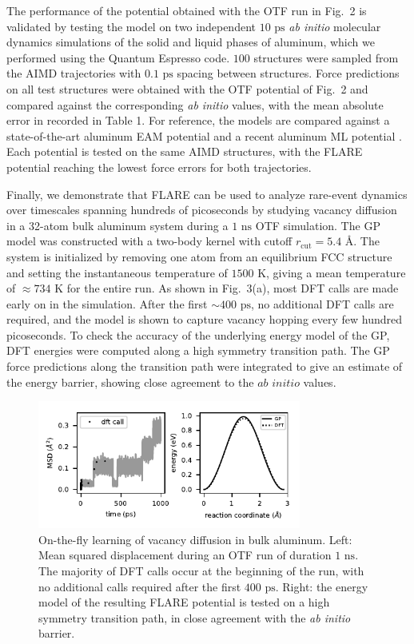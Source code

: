 \documentclass[%
superscriptaddress,
preprint,
linenumbers,
amsmath,amssymb,
aps,
prl,
]{revtex4-1}
\begin{document}
The performance of the potential obtained with the OTF run in Fig.\ 2 is validated by testing the model on two independent $10 \text{ ps}$ \textit{ab initio} molecular dynamics simulations of the solid and liquid phases of aluminum, which we performed using the Quantum Espresso code. $100$ structures were sampled from the AIMD trajectories with $0.1 \text{ ps}$ spacing between structures. Force predictions on all test structures were obtained with the OTF potential of Fig.\ 2 and compared against the corresponding \textit{ab initio} values, with the mean absolute error in  recorded in Table 1. For reference, the models are compared against a state-of-the-art aluminum EAM potential \cite{sheng2011highly} and a recent aluminum ML potential \cite{botu2016machine}. Each potential is tested on the same AIMD structures, with the FLARE potential reaching the lowest force errors for both trajectories.

Finally, we demonstrate that FLARE can be used to analyze rare-event dynamics over timescales spanning hundreds of picoseconds by studying vacancy diffusion in a 32-atom bulk aluminum system during a $1 \text{ ns}$ OTF simulation. The GP model was constructed with a two-body kernel with cutoff $r_{\text{cut}} = 5.4 \text{ \AA}$. The system is initialized by removing one atom from an equilibrium FCC structure and setting the instantaneous temperature of $1500 \text{ K}$, giving a mean temperature of $\approx 734 \text{ K}$ for the entire run. As shown in Fig.\ 3(a), most DFT calls are made early on in the simulation. After the first $\sim 400 \text{ ps}$, no additional DFT calls are required, and the model is shown to capture vacancy hopping every few hundred picoseconds. To check the accuracy of the underlying energy model of the GP, DFT energies were computed along a high symmetry transition path. The GP force predictions along the transition path were integrated to give an estimate of the energy barrier, showing close agreement to the $\textit{ab initio}$ values.

\begin{figure}
	\centering
	\includegraphics[width=3.41in]{vac.pdf}
	\caption{On-the-fly learning of vacancy diffusion in bulk aluminum. Left: Mean squared displacement during an OTF run of duration $1 \text{ ns}$. The majority of DFT calls occur at the beginning of the run, with no additional calls required after the first $400 \text{ ps}$. Right: the energy model of the resulting FLARE potential is tested on a high symmetry transition path, in close agreement with the \textit{ab initio} barrier.}
\end{figure}
\end{document}
